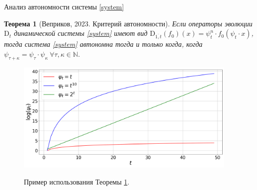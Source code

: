 \documentclass{beamer}
\newtheorem{theorem_rus}{Теорема}
\begin{document}
\begin{frame}{Анализ автономности системы \eqref{system}}
    \begin{theorem_rus}[Веприков, 2023. Критерий автономности] \label{semigroup}
        Если операторы эволюции $\text{D}_t$ динамической системы \eqref{system} имеют вид $\text{D}_{\overline{1, t}}(f_0)(x) = \psi_t^n \cdot f_0(\psi_t \cdot x)$, тогда система \eqref{system} автономна тогда и только когда, когда \color{blue}
        $
            \psi_{\tau + \kappa} = \psi_{\tau} \cdot \psi_{\kappa} ~\forall \tau, \kappa \in \mathbb{N}.
        $
        \color{black}
    \end{theorem_rus}

    \begin{figure}
        \centering
        \includegraphics[width=0.95\textwidth]{fig/fig3.png}

        Пример использования Теоремы \ref{semigroup}.
    \end{figure}
\end{frame}
\end{document}

